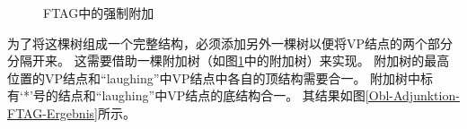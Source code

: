 \begin{figure}
\caption{\label{Obl-Adjunktion-FTAG}FTAG中的强制附加}
\end{figure}%
为了将这棵树组成一个完整结构，必须添加另外一棵树以便将VP结点的两个部分分隔开来。
这需要借助一棵附加树（如图\ref{Obl-Adjunktion-FTAG}中的附加树）来实现。
附加树的最高位置的VP结点和``laughing''中VP结点中各自的顶结构需要合一。
附加树中标有`*'号的结点和``laughing''中VP结点的底结构合一。
其结果如图\vref{Obl-Adjunktion-FTAG-Ergebnis}所示。
